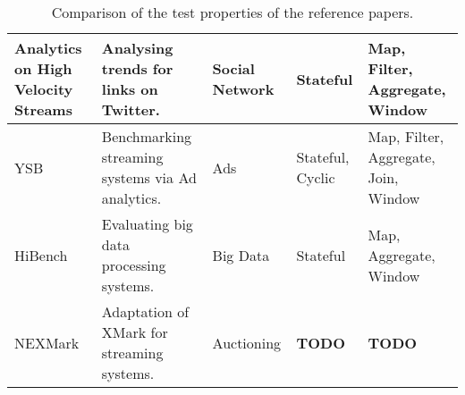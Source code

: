 \begin{table}[H]
{\begin{tabular}{|p{3cm}|p{4cm}|p{3cm}|p{2.5cm}|p{2.5cm}|}
      Analytics on High Velocity Streams\cite{storm2}
      & Analysing trends for links on Twitter.
      & Social Network
      & Stateful
      & Map, Filter, Aggregate, Window
      \\\hline

      YSB\cite{ysb}
      & Benchmarking streaming systems via Ad analytics.
      & Ads
      & Stateful, Cyclic
      & Map, Filter, Aggregate, Join, Window
      \\\hline

      HiBench\cite{hibench}
      & Evaluating big data processing systems.
      & Big Data
      & Stateful
      & Map, Aggregate, Window
      \\\hline

      NEXMark\cite{nexmark}
      & Adaptation of XMark for streaming systems.
      & Auctioning
      & {\bfseries TODO}
      & {\bfseries TODO}
      \\\hline
    \end{tabular}
  }
  \caption{Comparison of the test properties of the reference papers.}
  \label{table:test-properties}
\end{table}

